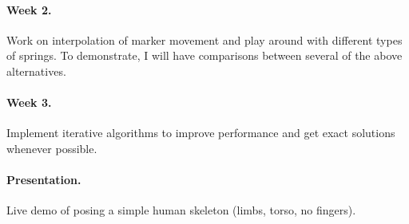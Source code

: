 \documentclass[10pt,twocolumn,letterpaper]{article}
\begin{document}
\paragraph{Week 2.} Work on interpolation of marker movement and play around with different types of springs. To demonstrate, I will have comparisons between several of the above alternatives.

\paragraph{Week 3.} Implement iterative algorithms to improve performance and get exact solutions whenever possible.

\paragraph{Presentation.} Live demo of posing a simple human skeleton (limbs, torso, no fingers).



\end{document}
